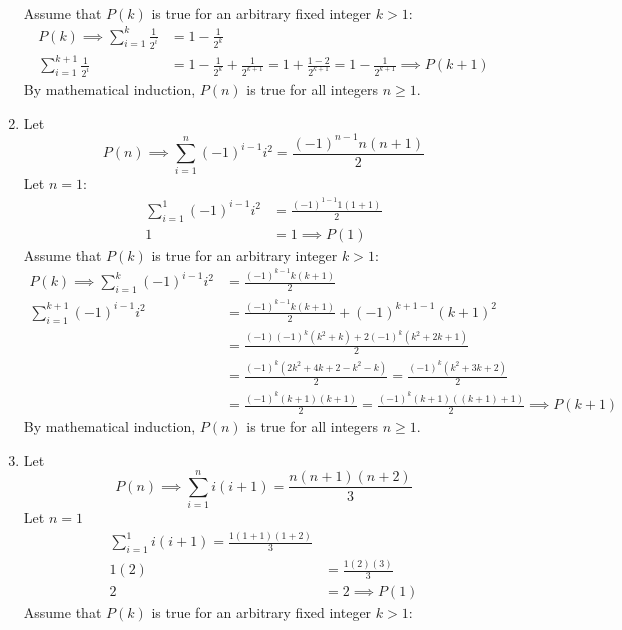 \documentclass[12pt, A4]{article}
\begin{document}
\begin{enumerate}
\begin{tasks}
\begin{align*}
								\end{align*}
								Assume that \(P(k)\) is true for an arbitrary fixed integer \(k > 1\):
								\begin{align*}
									P(k) \implies \sum_{i = 1}^k \frac{1}{2^i} &= 1 - \frac{1}{2^k} \\
									\sum_{i = 1}^{k + 1} \frac{1}{2^i} &= 1 - \frac{1}{2^k} + \frac{1}{2^{k + 1}}
											= 1 + \frac{1 - 2}{2^{k + 1}}
											= 1 - \frac{1}{2^{k + 1}}
											\implies P(k + 1)
								\end{align*}
								By mathematical induction, \(P(n)\) is true for all integers \(n \ge 1\).
					\end{tasks}
				\setcounter{enumi}{12}
				\item
					Let
						\[P(n) \implies \sum_{i = 1}^n (-1)^{i - 1}i^2 = \frac{(-1)^{n - 1}n(n + 1)}{2}\]
						Let \(n = 1\):
						\begin{align*}
							\sum_{i = 1}^1 (-1)^{i - 1}i^2 &= \frac{(-1)^{1 - 1}1(1 + 1)}{2} \\
							1 &= 1 \implies P(1)
						\end{align*}
						Assume that \(P(k)\) is true for an arbitrary integer \(k > 1\):
						\begin{align*}
							P(k) \implies \sum_{i = 1}^k (-1)^{i - 1}i^2 &= \frac{(-1)^{k - 1}k(k + 1)}{2} \\
							\sum_{i = 1}^{k + 1} (-1)^{i - 1}i^2 &= \frac{(-1)^{k - 1}k(k + 1)}{2} + (-1)^{k + 1 - 1}(k + 1)^2 \\
								&= \frac{(-1)(-1)^{k}(k^2 + k) + 2(-1)^k(k^2 + 2k + 1)}{2} \\
								&= \frac{(-1)^k(2k^2 + 4k + 2 - k^2 - k)}{2}
										= \frac{(-1)^k(k^2 + 3k + 2)}{2} \\
								&= \frac{(-1)^{k}(k + 1)(k + 1)}{2}
										= \frac{(-1)^k(k + 1)((k + 1) + 1)}{2}
										\implies P(k + 1)
						\end{align*}
						By mathematical induction, \(P(n)\) is true for all integers \(n \ge 1\).
				\setcounter{enumi}{14}
				\item
					Let
						\[P(n) \implies \sum_{i = 1}^n i(i + 1) = \frac{n(n + 1)(n + 2)}{3}\]
						Let \(n = 1\)
						\begin{align*}
							\sum_{i = 1}^1 i(i + 1) = \frac{1(1 + 1)(1 + 2)}{3} \\
							1(2) &= \frac{1(2)(3)}{3} \\
							2 &= 2 \implies P(1)
						\end{align*}
						Assume that \(P(k)\) is true for an arbitrary fixed integer \(k > 1\):

\end{enumerate}
\end{document}
